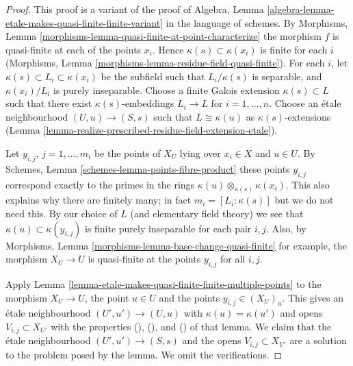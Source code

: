 \begin{proof}
This proof is a variant of the proof of
Algebra, Lemma \ref{algebra-lemma-etale-makes-quasi-finite-finite-variant}
in the language of schemes.
By Morphisms, Lemma \ref{morphisms-lemma-quasi-finite-at-point-characterize}
the morphism $f$ is quasi-finite at each of the points $x_i$.
Hence $\kappa(s) \subset \kappa(x_i)$ is finite for each $i$
(Morphisms, Lemma \ref{morphisms-lemma-residue-field-quasi-finite}).
For each $i$, let $\kappa(s) \subset L_i \subset \kappa(x_i)$
be the subfield such that $L_i/\kappa(s)$ is separable, and
$\kappa(x_i)/L_i$ is purely inseparable. Choose a finite Galois
extension $\kappa(s) \subset L$ such that there exist
$\kappa(s)$-embeddings $L_i \to L$ for $i = 1, \ldots, n$.
Choose an \'etale neighbourhood $(U, u) \to (S, s)$ such that
$L \cong \kappa(u)$ as $\kappa(s)$-extensions
(Lemma \ref{lemma-realize-prescribed-residue-field-extension-etale}).

\medskip\noindent
Let $y_{i, j}$, $j = 1, \ldots, m_i$ be the points of $X_U$
lying over $x_i \in X$ and $u \in U$. By
Schemes, Lemma \ref{schemes-lemma-points-fibre-product}
these points $y_{i, j}$ correspond exactly to the primes in the rings
$\kappa(u) \otimes_{\kappa(s)} \kappa(x_i)$. This also
explains why there are finitely many; in fact
$m_i = [L_i : \kappa(s)]$ but we do not need this.
By our choice of
$L$ (and elementary field theory)
we see that $\kappa(u) \subset \kappa(y_{i, j})$ is
finite purely inseparable for each pair $i, j$.
Also, by Morphisms, Lemma \ref{morphisms-lemma-base-change-quasi-finite}
for example, the morphism
$X_U \to U$ is quasi-finite at the points $y_{i, j}$ for
all $i, j$.

\medskip\noindent
Apply Lemma \ref{lemma-etale-makes-quasi-finite-finite-multiple-points}
to the morphism $X_U \to U$, the point $u \in U$
and the points $y_{i, j} \in (X_U)_u$. This gives an \'etale neighbourhood
$(U', u') \to (U, u)$ with $\kappa(u) = \kappa(u')$ and
opens $V_{i, j} \subset X_{U'}$ with the properties
(), (), and ()
of that lemma. We claim that the \'etale neighbourhood
$(U', u') \to (S, s)$ and the opens $V_{i, j} \subset X_{U'}$
are a solution to the problem posed by the lemma.
We omit the verifications.
\end{proof}

